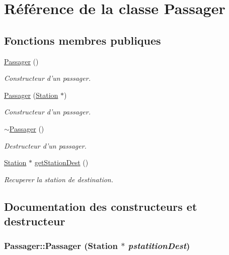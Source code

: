 \hypertarget{classPassager}{
\section{Référence de la classe Passager}
\label{classPassager}
}
\subsection*{Fonctions membres publiques}
\begin{DoxyCompactItemize}
\item 
\hypertarget{classPassager_abaa10f10af62627931cfdf9a57da07e3}{
\hyperlink{classPassager_abaa10f10af62627931cfdf9a57da07e3}{Passager} ()}
\label{classPassager_abaa10f10af62627931cfdf9a57da07e3}

\begin{DoxyCompactList}\small\item\em Constructeur d'un passager. \item\end{DoxyCompactList}\item 
\hyperlink{classPassager_aad5c03eba33134fe3f63bc814b622f2e}{Passager} (\hyperlink{classStation}{Station} $\ast$)
\begin{DoxyCompactList}\small\item\em Constructeur d'un passager. \item\end{DoxyCompactList}\item 
\hypertarget{classPassager_a6afb6fea48617a8eec07a53e7f3f5ebc}{
\hyperlink{classPassager_a6afb6fea48617a8eec07a53e7f3f5ebc}{$\sim$Passager} ()}
\label{classPassager_a6afb6fea48617a8eec07a53e7f3f5ebc}

\begin{DoxyCompactList}\small\item\em Destructeur d'un passager. \item\end{DoxyCompactList}\item 
\hyperlink{classStation}{Station} $\ast$ \hyperlink{classPassager_a743190997fecd1b8b0660c2c93ca4f5f}{getStationDest} ()
\begin{DoxyCompactList}\small\item\em Recuperer la station de destination. \item\end{DoxyCompactList}\end{DoxyCompactItemize}


\subsection{Documentation des constructeurs et destructeur}
\hypertarget{classPassager_aad5c03eba33134fe3f63bc814b622f2e}{
\subsubsection[{Passager}]{\setlength{\rightskip}{0pt plus 5cm}Passager::Passager ({\bf Station} $\ast$ {\em pstatitionDest})}}
\label{classPassager_aad5c03eba33134fe3f63bc814b622f2e}


